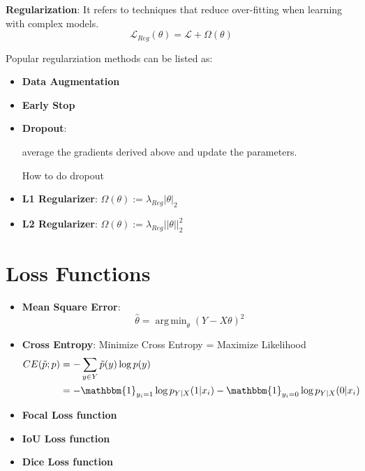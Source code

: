 \documentclass[a4paper]{article}
\DeclareMathOperator*{\argmin}{arg\,min}
\begin{document}
\textbf{Regularization}: It refers to techniques that reduce over-fitting when learning with complex models.
\begin{equation}
	\mathcal{L}_{Reg} (\theta) = \mathcal{L} + \Omega(\theta)
\end{equation}

Popular regularziation methods can be listed as:
\begin{itemize}
	\item \textbf{Data Augmentation}
	\item \textbf{Early Stop}
	\item \textbf{Dropout}: 
	\begin{algorithm}[h]
		\SetAlgoLined
		average the gradients derived above and update the parameters.
		\caption{How to do dropout}
	\end{algorithm}
	\item \textbf{L1 Regularizer}: $\Omega(\theta) := \lambda_{Reg} | \theta | _2$
	\item \textbf{L2 Regularizer}: $\Omega(\theta) := \lambda_{Reg} || \theta || _2^2$
\end{itemize}

\section{Loss Functions}

\begin{itemize}
	\item \textbf{Mean Square Error}:
	\begin{equation}
		\hat{\theta} = \argmin_{\theta} ( Y - X \theta )^2
	\end{equation}
	\item \textbf{Cross Entropy}: Minimize Cross Entropy = Maximize Likelihood
	\begin{align}
		CE(\tilde{p}; p) &= - \sum_{y \in Y} \tilde{p} (y) \log p(y) \\
		&= - \mathbbm{1}_{y_i = 1} \log p_{Y|X} (1 | x_i) - \mathbbm{1}_{y_i = 0} \log p_{Y|X} (0 | x_i)
	\end{align}
	\item \textbf{Focal Loss function}
	\item \textbf{IoU Loss function}
	\item \textbf{Dice Loss function}
\end{itemize}
\end{document}
